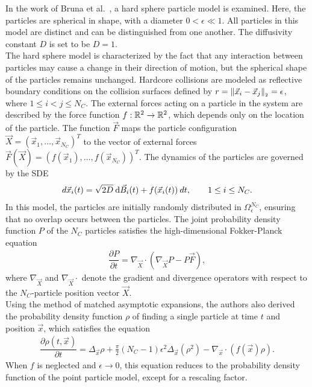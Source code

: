 In the work of Bruna et al.~\cite{Bruna2012}, a hard sphere particle model is examined.
Here, the particles are spherical in shape, with a diameter $0 < \epsilon \ll 1$.
All particles in this model are distinct and can be distinguished from one another. 
The diffusivity constant $D$ is set to be $D=1$. \\
The hard sphere model is characterized by the fact that any interaction between particles may cause a change in their direction of motion, but the spherical shape of the particles remains unchanged.
Hardcore collisions are modeled as reflective boundary conditions on the collision surfaces defined by $r = \norm[\vec{x}_i - \vec{x}_j] = \epsilon$, where $1 \leq i < j \leq N_C$.
The external forces acting on a particle in the system are described by the force function $f: \mathbb{R}^2 \rightarrow \mathbb{R}^2$, which depends only on the location of the particle.
The function $\vec{F}$ maps the particle configuration $\vec{X} = (\vec{x}_1, \ldots, \vec{x}_{N_C})^T$ to the vector of external forces $\vec{F}(\vec{X}) = (f(\vec{x}_1), \ldots, f(\vec{x}_{N_C}))^T$.
The dynamics of the particles are governed by the SDE
\begin{align*}
	d\vec{x}_i(t) = \sqrt{2D} \: \mathrm{d} \vec{B}_i(t) + f(\vec{x}_i(t)) \: dt, \qquad 1 \leq i \leq N_C.
\end{align*}
In this model, the particles are initially randomly distributed in $\Omega^{N_C}_{\epsilon}$, ensuring that no overlap occurs between the particles.
The joint probability density function $P$ of the $N_C$ particles satisfies the high-dimensional Fokker-Planck equation
\begin{align*}
	\dfrac{\partial P}{\partial t} = \nabla_{\vec{X}} \cdot ( \nabla_{\vec{X}} P - P \vec{F}),
\end{align*}
where $\nabla_{\vec{X}}$ and $\nabla_{\vec{X}} \cdot$ denote the gradient and divergence operators with respect to the $N_C$-particle position vector $\vec{X}$.\\
Using the method of matched asymptotic expansions, the authors also derived the probability density function $\rho$ of finding a single particle at time $t$ and position $\vec{x}$, which satisfies the equation
\begin{align}
	\dfrac{\partial \rho (t, \vec{x})}{\partial t} = \Delta_{\vec{x}} \rho + \frac{\pi}{2} (N_C - 1) \epsilon^2 \Delta_{\vec{x}} (\rho^2) - \nabla_{\vec{x}} \cdot (f(\vec{x}) \rho).
	\label{equ:hardsphere}
\end{align}
When $f$ is neglected and $\epsilon \rightarrow 0$, this equation reduces to the probability density function of the point particle model, except for a rescaling factor.
